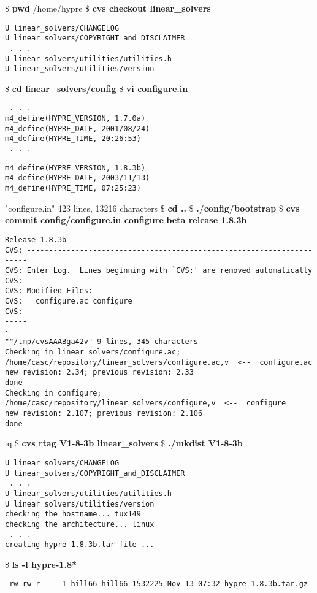 \begin{ttfamily}
\begin{mdseries}
\linebreak
\$ \textbf{pwd}\linebreak
/home/hypre\linebreak
\$ \textbf{cvs checkout linear\_solvers}\linebreak
\begin{verbatim}
U linear_solvers/CHANGELOG
U linear_solvers/COPYRIGHT_and_DISCLAIMER
 . . .
U linear_solvers/utilities/utilities.h
U linear_solvers/utilities/version
\end{verbatim}
\$ \textbf{cd linear\_solvers/config}\linebreak
\$ \textbf{vi configure.in}\linebreak
\begin{verbatim}
 . . .
m4_define(HYPRE_VERSION, 1.7.0a)
m4_define(HYPRE_DATE, 2001/08/24)
m4_define(HYPRE_TIME, 20:26:53)
 . . .
\end{verbatim}
\begin{bfseries}
\begin{verbatim}
m4_define(HYPRE_VERSION, 1.8.3b)
m4_define(HYPRE_DATE, 2003/11/13)
m4_define(HYPRE_TIME, 07:25:23)
\end{verbatim}
\end{bfseries}
"configure.in" 423 lines, 13216 characters\linebreak
\$ \textbf{cd ..}
\$ \textbf{./config/bootstrap}
\$ \textbf{cvs commit config/configure.in configure}\linebreak
\textbf{beta release 1.8.3b}\linebreak
\begin{verbatim}
Release 1.8.3b
CVS: ----------------------------------------------------------------------
CVS: Enter Log.  Lines beginning with `CVS:' are removed automatically
CVS:
CVS: Modified Files:
CVS:   configure.ac configure
CVS: ----------------------------------------------------------------------
~
""/tmp/cvsAAABga42v" 9 lines, 345 characters
Checking in linear_solvers/configure.ac;
/home/casc/repository/linear_solvers/configure.ac,v  <--  configure.ac
new revision: 2.34; previous revision: 2.33
done
Checking in configure;
/home/casc/repository/linear_solvers/configure,v  <--  configure
new revision: 2.107; previous revision: 2.106
done
\end{verbatim}
:q
\$ \textbf{cvs rtag V1-8-3b linear\_solvers}\linebreak
\$ \textbf{./mkdist V1-8-3b}\linebreak
\begin{verbatim}
U linear_solvers/CHANGELOG
U linear_solvers/COPYRIGHT_and_DISCLAIMER
 . . .
U linear_solvers/utilities/utilities.h
U linear_solvers/utilities/version
checking the hostname... tux149
checking the architecture... linux
 . . .
creating hypre-1.8.3b.tar file ...
\end{verbatim}
\$ \textbf{ls -l hypre-1.8*}\linebreak
\begin{verbatim}
-rw-rw-r--   1 hill66 hill66 1532225 Nov 13 07:32 hypre-1.8.3b.tar.gz


\end{verbatim}
\end{mdseries}
\end{ttfamily}
